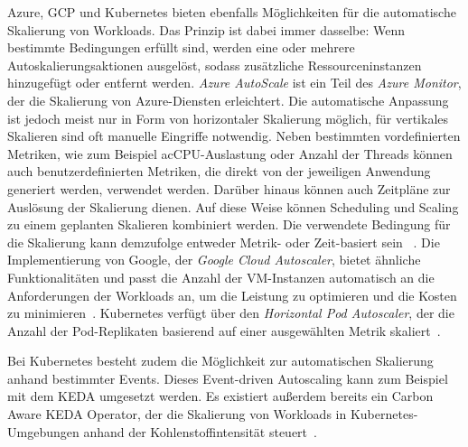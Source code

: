 Azure, \ac{GCP} und Kubernetes bieten ebenfalls Möglichkeiten für die automatische Skalierung von Workloads.
Das Prinzip ist dabei immer dasselbe:
Wenn bestimmte Bedingungen erfüllt sind, werden eine oder mehrere Autoskalierungsaktionen ausgelöst, sodass zusätzliche Ressourceninstanzen hinzugefügt oder entfernt werden.
\textit{Azure AutoScale} ist ein Teil des \textit{Azure Monitor}, der die Skalierung von Azure-Diensten erleichtert.
Die automatische Anpassung ist jedoch meist nur in Form von horizontaler Skalierung möglich, für vertikales Skalieren sind oft manuelle Eingriffe notwendig.
Neben bestimmten vordefinierten Metriken, wie zum Beispiel ac{CPU}-Auslastung oder Anzahl der Threads können auch benutzerdefinierten Metriken, die direkt von der jeweiligen Anwendung generiert werden, verwendet werden.
Darüber hinaus können auch Zeitpläne zur Auslösung der Skalierung dienen.
Auf diese Weise können Scheduling und Scaling zu einem geplanten Skalieren kombiniert werden.
Die verwendete Bedingung für die Skalierung kann demzufolge entweder Metrik- oder Zeit-basiert sein ~\cite{Microsoft.2023}.
Die Implementierung von Google, der \textit{Google Cloud Autoscaler}, bietet ähnliche Funktionalitäten und passt die Anzahl der \ac{VM}-Instanzen automatisch an die Anforderungen der Workloads an, um die Leistung zu optimieren und die Kosten zu minimieren~\cite{GoogleCloud.2024}.
Kubernetes verfügt über den \textit{Horizontal Pod Autoscaler}, der die Anzahl der Pod-Replikaten basierend auf einer ausgewählten Metrik skaliert~\cite{Kebbani.2022}.

Bei Kubernetes besteht zudem die Möglichkeit zur automatischen Skalierung anhand bestimmter Events.
Dieses Event-driven Autoscaling kann zum Beispiel mit dem \ac{KEDA} umgesetzt werden.
Es existiert außerdem bereits ein Carbon Aware \ac{KEDA} Operator, der die Skalierung von Workloads in Kubernetes-Umgebungen anhand der Kohlenstoffintensität steuert~\cite{Azure.20240321T11:03:47.000Z}.

